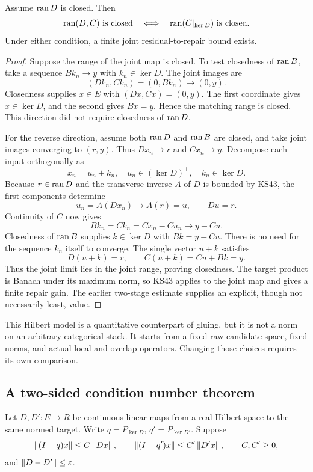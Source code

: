 \begin{theorem}\label{KS47}
Assume \(\operatorname{ran} D\) is closed. Then
\[
 \operatorname{ran}(D,C)\text{ is closed}\quad\Longleftrightarrow\quad
 \operatorname{ran}(C|_{\ker D})\text{ is closed}.
\]
Under either condition, a finite joint residual-to-repair bound exists.
\end{theorem}
\begin{proof}
Suppose the range of the joint map is closed. To test closedness of $\operatorname{ran} B$, take a sequence $Bk_n\to y$ with $k_n\in\ker D$. The joint images are
\[
 (Dk_n,Ck_n)=(0,Bk_n)\longrightarrow(0,y).
\]
Closedness supplies $x\in E$ with $(Dx,Cx)=(0,y)$. The first coordinate gives $x\in\ker D$, and the second gives $Bx=y$. Hence the matching range is closed. This direction did not require closedness of $\operatorname{ran} D$.

For the reverse direction, assume both $\operatorname{ran} D$ and $\operatorname{ran} B$ are closed, and take joint images converging to $(r,y)$. Thus $Dx_n\to r$ and $Cx_n\to y$. Decompose each input orthogonally as
\[
 x_n=u_n+k_n,\quad
 u_n\in(\ker D)^\perp,\quad k_n\in\ker D.
\]
Because $r\in\operatorname{ran} D$ and the transverse inverse $A$ of $D$ is bounded by KS43, the first components determine
\[
 u_n=A(Dx_n)\longrightarrow A(r)=u,
 \qquad Du=r.
\]
Continuity of $C$ now gives
\[
 Bk_n=Ck_n=Cx_n-Cu_n\longrightarrow y-Cu.
\]
Closedness of $\operatorname{ran} B$ supplies $k\in\ker D$ with $Bk=y-Cu$. There is no need for the sequence $k_n$ itself to converge. The single vector $u+k$ satisfies
\[
 D(u+k)=r,
 \qquad C(u+k)=Cu+Bk=y.
\]
Thus the joint limit lies in the joint range, proving closedness. The target product is Banach under its maximum norm, so KS43 applies to the joint map and gives a finite repair gain. The earlier two-stage estimate supplies an explicit, though not necessarily least, value.
\end{proof}


This Hilbert model is a quantitative counterpart of gluing, but it is not a norm on an arbitrary categorical stack. It starts from a fixed raw candidate space, fixed norms, and actual local and overlap operators. Changing those choices requires its own comparison.

\label{sec:motion}
\subsection{A two-sided condition number theorem}
Let \(D,D':E\to R\) be continuous linear maps from a real Hilbert space to the same normed target. Write \(q=P_{\ker D}\), \(q'=P_{\ker D'}\). Suppose
\[
 \left\lVert(I-q)x\right\rVert\le C\left\lVert Dx\right\rVert,\qquad
 \left\lVert(I-q')x\right\rVert\le C'\left\lVert D'x\right\rVert,\qquad C,C'\ge0,
\]
and \(\left\lVert D-D'\right\rVert\le\varepsilon\).

